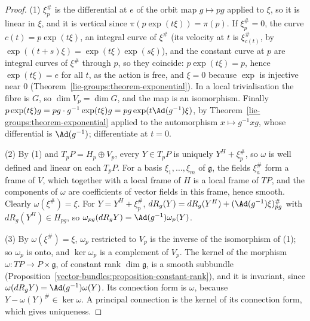 \begin{proof}
(1) $\xi^\#_p$ is the differential at $e$ of the orbit map $g \mapsto pg$ applied to $\xi$, so it is linear in $\xi$, and it is vertical since $\pi(p\exp(t\xi)) = \pi(p)$. If $\xi^\#_p = 0$,
the curve $c(t) = p\exp(t\xi)$, an integral curve of $\xi^\#$ (its velocity at $t$ is $\xi^\#_{c(t)}$, by $\exp((t + s)\xi) = \exp(t\xi)\exp(s\xi)$), and the constant curve at $p$ are integral
curves of $\xi^\#$ through $p$, so they coincide: $p\exp(t\xi) = p$, hence $\exp(t\xi) = e$ for all $t$, as the action is free, and $\xi = 0$ because $\exp$ is injective near $0$
(Theorem~\ref{lie-groups:theorem-exponential}). In a local trivialisation the fibre is $G$, so $\dim V_p = \dim G$, and the map is an isomorphism. Finally
$p\exp(t\xi)g = pg \cdot g^{-1}\exp(t\xi)g = pg\exp(t\Ad(g^{-1})\xi)$, by Theorem~\ref{lie-groups:theorem-exponential} applied to the automorphism $x \mapsto g^{-1}xg$, whose differential
is $\Ad(g^{-1})$; differentiate at $t = 0$.

(2) By (1) and $T_pP = H_p \oplus V_p$, every $Y \in T_pP$ is uniquely $Y^H + \xi^\#_p$, so $\omega$ is well defined and linear on each $T_pP$. For a basis $\xi_1, \ldots, \xi_m$ of $\mathfrak{g}$,
the fields $\xi_a^\#$ form a frame of $V$, which together with a local frame of $H$ is a local frame of $TP$, and the components of $\omega$ are coefficients of vector fields in this
frame, hence smooth. Clearly $\omega(\xi^\#) = \xi$. For $Y = Y^H + \xi^\#_p$, $dR_g(Y) = dR_g(Y^H) + (\Ad(g^{-1})\xi)^\#_{pg}$ with $dR_g(Y^H) \in H_{pg}$, so
$\omega_{pg}(dR_gY) = \Ad(g^{-1})\omega_p(Y)$.

(3) By $\omega(\xi^\#) = \xi$, $\omega_p$ restricted to $V_p$ is the inverse of the isomorphism of (1); so $\omega_p$ is onto, and $\ker\omega_p$ is a complement of $V_p$. The kernel of the
morphism $\omega \colon TP \to P \times \mathfrak{g}$, of constant rank $\dim\mathfrak{g}$, is a smooth subbundle (Proposition~\ref{vector-bundles:proposition-constant-rank}), and it is invariant,
since $\omega(dR_gY) = \Ad(g^{-1})\omega(Y)$. Its connection form is $\omega$, because $Y - \omega(Y)^\# \in \ker\omega$. A principal connection is the kernel of its connection form, which
gives uniqueness.
\end{proof}

